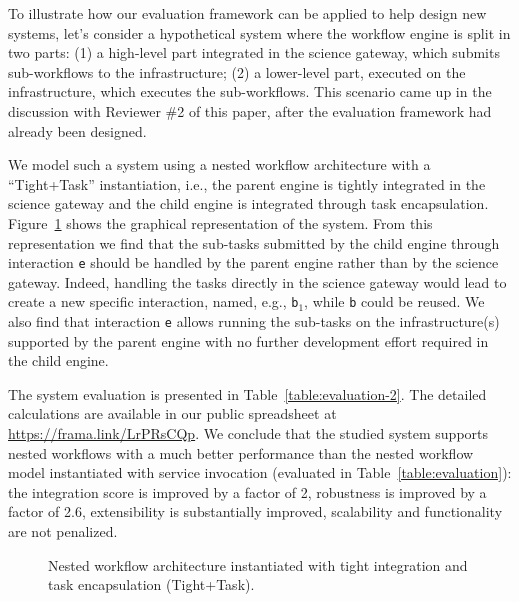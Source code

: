 \documentclass[preprint,3p,twocolumn]{elsarticle}
\newcommand{\correction}[1]{\color{blue}#1\color{black}\xspace}
\begin{document}
\correction{To illustrate how our evaluation framework can be applied
  to help design new systems, let's consider a hypothetical system
  where the workflow engine is split in two parts: (1) a high-level
  part integrated in the science gateway, which submits sub-workflows
  to the infrastructure; (2) a lower-level part, executed on the
  infrastructure, which executes the sub-workflows. This scenario came
  up in the discussion with Reviewer \#2 of this paper, after the
  evaluation framework had already been designed.

  We model such a system using a nested workflow architecture with a
  ``Tight+Task'' instantiation, i.e., the parent engine is tightly
  integrated in the science gateway and the child engine is integrated
  through task encapsulation.  Figure~\ref{fig:nested-3} shows the
  graphical representation of the system. From this representation we
  find that the sub-tasks submitted by the child engine through
  interaction \texttt{e} should be handled by the parent engine rather
  than by the science gateway. Indeed, handling the tasks directly in
  the science gateway would lead to create a new specific interaction,
  named, e.g., \texttt{b$_1$}, while \texttt{b} could be reused. We
  also find that interaction \texttt{e} allows running the sub-tasks
  on the infrastructure(s) supported by the parent engine with no
  further development effort required in the child engine.

  The system evaluation is presented in
  Table~\ref{table:evaluation-2}. The detailed calculations are
  available in our public spreadsheet at
  \url{https://frama.link/LrPRsCQp}. We conclude that the studied system
  supports nested workflows with a much better performance than the
  nested workflow model instantiated with service invocation
  (evaluated in Table~\ref{table:evaluation}): the integration score
  is improved by a factor of 2, robustness is improved by a factor of
  2.6, extensibility is substantially improved, scalability and
  functionality are not penalized.  }

\begin{figure}
  \centering
  \def\svgwidth{0.5\columnwidth}
  
\caption{\correction{Nested workflow architecture instantiated with tight integration and task encapsulation (Tight+Task).}}
\label{fig:nested-3}
\end{figure}
\end{document}
